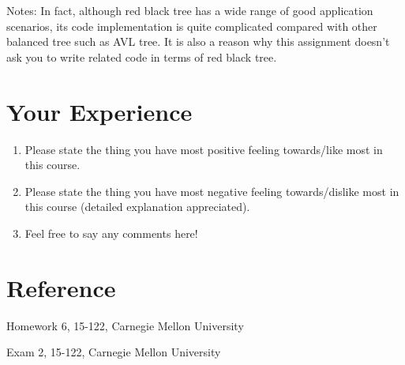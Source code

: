 \documentclass[11pt]{exam}
\begin{document}
Notes: In fact, although red black tree has a wide range of good application scenarios, its code implementation is quite complicated compared with other balanced tree such as AVL tree. It is also a reason why this assignment doesn't ask you to write related code in terms of red black tree.
\section{Your Experience}
\begin{enumerate}[1)]
    \item Please state the thing you have most positive feeling towards/like most in this course.
    \item Please state the thing you have most negative feeling towards/dislike most in this course (detailed explanation appreciated).
    \item Feel free to say any comments here!
\end{enumerate}

\section*{Reference}

Homework 6, 15-122, Carnegie Mellon University

Exam 2, 15-122, Carnegie Mellon University
\end{document}
